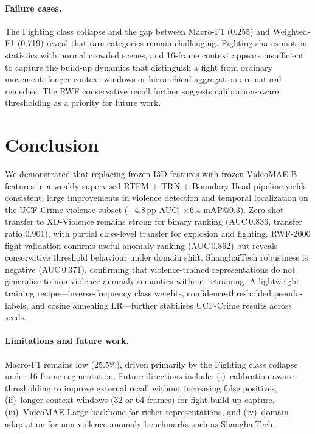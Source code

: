\documentclass[11pt]{article}
\begin{document}
\paragraph{Failure cases.}
The Fighting class collapse and the gap between Macro-F1 (0.255) and
Weighted-F1 (0.719) reveal that rare categories remain challenging.
Fighting shares motion statistics with normal crowded scenes, and 16-frame
context appears insufficient to capture the build-up dynamics that distinguish
a fight from ordinary movement; longer context windows or hierarchical
aggregation are natural remedies.
The RWF conservative recall further suggests calibration-aware thresholding
as a priority for future work.


\section{Conclusion}
\label{sec:conclude}

We demonstrated that replacing frozen I3D features with frozen VideoMAE-B
features in a weakly-supervised RTFM + TRN + Boundary Head pipeline yields
consistent, large improvements in violence detection and temporal localization
on the UCF-Crime violence subset ($+$4.8\,pp AUC, ${\times}6.4$ mAP@0.3).
Zero-shot transfer to XD-Violence remains strong for binary ranking
(AUC\,0.836, transfer ratio 0.901), with partial class-level transfer for
explosion and fighting.
RWF-2000 fight validation confirms useful anomaly ranking (AUC\,0.862) but
reveals conservative threshold behaviour under domain shift.
ShanghaiTech robustness is negative (AUC\,0.371), confirming that
violence-trained representations do not generalise to non-violence anomaly
semantics without retraining.
A lightweight training recipe—inverse-frequency class weights,
confidence-thresholded pseudo-labels, and cosine annealing LR—further
stabilises UCF-Crime results across seeds.

\paragraph{Limitations and future work.}
Macro-F1 remains low (25.5\%), driven primarily by the Fighting class
collapse under 16-frame segmentation.
Future directions include: (i)~calibration-aware thresholding to improve
external recall without increasing false positives, (ii)~longer-context
windows (32 or 64 frames) for fight-build-up capture,
(iii)~VideoMAE-Large backbone for richer representations, and
(iv)~domain adaptation for non-violence anomaly benchmarks such as
ShanghaiTech.
\end{document}

